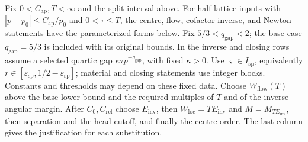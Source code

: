 \begin{lemma}\label{inf:fixed-detuning-extension}
Fix $0<C_{\mathrm{ap}},T<\infty$ and the split interval above.
For half-lattice inputs with $|p-p_0|\le C_{\mathrm{ap}}/p_0$ and
$0<\tau\le T$, the centre, flow, cofactor inverse, and Newton
statements have the parameterized forms below. Fix
$5/3<q_{\mathrm{gap}}<2$; the base case $q_{\mathrm{gap}}=5/3$
is included with its original bounds. In the inverse and closing
rows assume a selected quartic gap $\kappa\tau p^{-q_{\mathrm{gap}}}$,
with fixed $\kappa>0$.
Use $\varsigma\in I_{\mathrm{sp}}$, equivalently
$r\in[\varepsilon_{\mathrm{sp}},1/2-\varepsilon_{\mathrm{sp}}]$;
material and closing statements use integer blocks.
Constants and thresholds may depend on these fixed data.
Choose $W_{\mathrm{flow}}(T)$ above the base lower bound and the
required multiples of $T$ and of the inverse angular margin.
After $C_0,C_{\mathrm{rel}}$ choose $E_{\mathrm{inv}}$, then
$W_{\mathrm{loc}}=TE_{\mathrm{inv}}$ and $M=M_{TE_{\mathrm{inv}}}$,
then separation and the head cutoff, and finally the centre order.
The last column gives the justification for each substitution.


\end{lemma}
